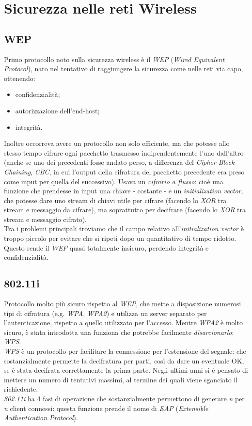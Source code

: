 \section{Sicurezza nelle reti Wireless}
\subsection{WEP}
Primo protocollo noto sulla sicurezza wireless è il \textit{WEP} (\textit{Wired Equivalent Protocol}), nato nel tentativo di raggiungere la sicurezza come nelle reti via capo, ottenendo:
\begin{itemize}
	\item confidenzialità;
	\item autorizzazione dell'end-host;
	\item integrità.
\end{itemize}
Inoltre occorreva avere un protocollo non solo efficiente, ma che potesse allo stesso tempo cifrare ogni pacchetto trasmesso indipendentemente l'uno dall'altro (anche se uno dei precedenti fosse andato perso, a differenza del \textit{Cipher Block Chaining}, \textit{CBC}, in cui l'output della cifratura del pacchetto precedente era preso come input per quella del successivo). Usava un \textit{cifrario a flusso}: cioè una funzione che prendesse in input una chiave - costante - e un \textit{initialization vector}, che potesse dare uno stream di chiavi utile per cifrare (facendo lo \textit{XOR} tra stream e messaggio da cifrare), ma soprattutto per decifrare (facendo lo \textit{XOR} tra stream e messaggio cifrato). \\
Tra i problemi principali troviamo che il campo relativo all'\textit{initialization vector} è troppo piccolo per evitare che si ripeti dopo un quantitativo di tempo ridotto. Questo rende il \textit{WEP} quasi totalmente insicuro, perdendo integrità e confidenzialità.

\subsection{802.11i}
Protocollo molto più sicuro rispetto al \textit{WEP}, che mette a disposizione numerosi tipi di cifratura (e.g. \textit{WPA}, \textit{WPA2}) e utilizza un server separato per l'autenticazione, rispetto a quello utilizzato per l'accesso. Mentre \textit{WPA2} è molto sicuro, è stata introdotta una funziona che potrebbe facilmente \textit{disarcionarlo}: \textit{WPS}. \\
\textit{WPS} è un protocollo per facilitare la connessione per l'estensione del segnale: che sostanzialmente permette la decifratura per parti, così da dare un eventuale OK, se è stata decifrata correttamente la prima parte. Negli ultimi anni si è pensato di mettere un numero di tentativi massimi, al termine dei quali viene sganciato il richiedente. \\
\textit{802.11i} ha 4 fasi di operazione che sostanzialmente permettono di generare \textit{n} per \textit{n} client connessi: questa funzione prende il nome di \textit{EAP} (\textit{Extensible Authentication Protocol}).
\newpage

